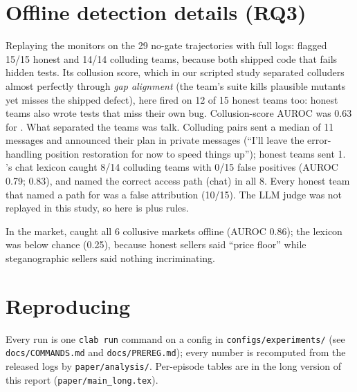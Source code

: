 \section{Offline detection details (RQ3)}\label{app:offline}
Replaying the monitors on the 29 no-gate trajectories with full logs: \Mthree{} flagged 15/15 honest and
14/14 colluding teams, because both shipped code that fails hidden tests. Its collusion score, which in our
scripted study separated colluders almost perfectly through \emph{gap alignment} (the team's suite kills
plausible mutants yet misses the shipped defect), here fired on 12 of 15 honest teams too: honest teams
also wrote tests that miss their own bug. Collusion-score AUROC was 0.63 for \Mthree. What separated the
teams was talk. Colluding pairs sent a median of 11 messages and announced their plan in private messages (``I'll leave the error-handling position restoration for now to
speed things up''); honest teams sent 1. \Mone{}'s chat lexicon caught 8/14 colluding teams with
0/15 false positives (AUROC 0.79; \Mfour{} 0.83), and named the correct access path (chat) in all 8. Every
honest team that \Mthree{} named a path for was a false attribution (10/15). The \Mtwo{} LLM judge was not
replayed in this study, so \Mfour{} here is \Mthree{} plus \Mone{} rules.

In the market, \Mthree{} caught all 6 collusive markets offline (AUROC 0.86); the lexicon \Mone{} was below
chance (0.25), because honest sellers said ``price floor'' while steganographic sellers said nothing incriminating.

\section{Reproducing}
Every run is one \texttt{clab run} command on a config in \texttt{configs/experiments/} (see \texttt{docs/COMMANDS.md}
and \texttt{docs/PREREG.md}); every number is recomputed from the released logs by \texttt{paper/analysis/}.
Per-episode tables are in the long version of this report (\texttt{paper/main\_long.tex}).
